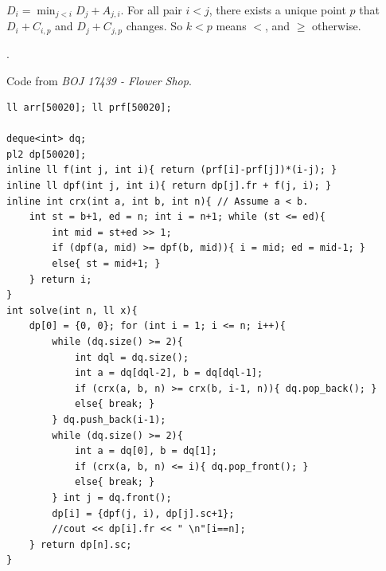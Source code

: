 $D_i = \min_{j<i} D_j + A_{j,i}$. For all pair $i < j$, there exists a unique point $p$ that $D_i + C_{i,p}$ and $D_j + C_{j,p}$ changes. So $k < p$ means $<$, and $\ge$ otherwise.

.

Code from \textit{BOJ 17439 - Flower Shop}.
\begin{verbatim}
ll arr[50020]; ll prf[50020];

deque<int> dq;
pl2 dp[50020];
inline ll f(int j, int i){ return (prf[i]-prf[j])*(i-j); }
inline ll dpf(int j, int i){ return dp[j].fr + f(j, i); }
inline int crx(int a, int b, int n){ // Assume a < b.
	int st = b+1, ed = n; int i = n+1; while (st <= ed){
		int mid = st+ed >> 1;
		if (dpf(a, mid) >= dpf(b, mid)){ i = mid; ed = mid-1; }
		else{ st = mid+1; }
	} return i;
}
int solve(int n, ll x){
	dp[0] = {0, 0}; for (int i = 1; i <= n; i++){
		while (dq.size() >= 2){
			int dql = dq.size();
			int a = dq[dql-2], b = dq[dql-1];
			if (crx(a, b, n) >= crx(b, i-1, n)){ dq.pop_back(); }
			else{ break; }
		} dq.push_back(i-1);
		while (dq.size() >= 2){
			int a = dq[0], b = dq[1];
			if (crx(a, b, n) <= i){ dq.pop_front(); }
			else{ break; }
		} int j = dq.front();
		dp[i] = {dpf(j, i), dp[j].sc+1};
		//cout << dp[i].fr << " \n"[i==n];
	} return dp[n].sc;
}
\end{verbatim}